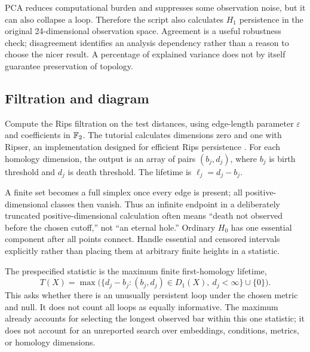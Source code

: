 PCA reduces computational burden and suppresses some observation noise, but it can also collapse a loop. Therefore the script also calculates $H_1$ persistence in the original 24-dimensional observation space. Agreement is a useful robustness check; disagreement identifies an analysis dependency rather than a reason to choose the nicer result. A percentage of explained variance does not by itself guarantee preservation of topology.

\subsection{Filtration and diagram}
Compute the Rips filtration on the test distances, using edge-length parameter $\varepsilon$ and coefficients in $\mathbb{F}_2$. The tutorial calculates dimensions zero and one with Ripser, an implementation designed for efficient Rips persistence \citep{app_bauer2021}. For each homology dimension, the output is an array of pairs $(b_j,d_j)$, where $b_j$ is birth threshold and $d_j$ is death threshold. The lifetime is $\ell_j=d_j-b_j$.

A finite set becomes a full simplex once every edge is present; all positive-dimensional classes then vanish. Thus an infinite endpoint in a deliberately truncated positive-dimensional calculation often means ``death not observed before the chosen cutoff,'' not ``an eternal hole.'' Ordinary $H_0$ has one essential component after all points connect. Handle essential and censored intervals explicitly rather than placing them at arbitrary finite heights in a statistic.

The prespecified statistic is the maximum finite first-homology lifetime,
\begin{equation}
 T(X)=\max\big(\{d_j-b_j:(b_j,d_j)\in D_1(X),\ d_j<\infty\}\cup\{0\}\big).
 \label{eq:09-statistic}
\end{equation}
This asks whether there is an unusually persistent loop under the chosen metric and null. It does not count all loops as equally informative. The maximum already accounts for selecting the longest observed bar within this one statistic; it does not account for an unreported search over embeddings, conditions, metrics, or homology dimensions.

